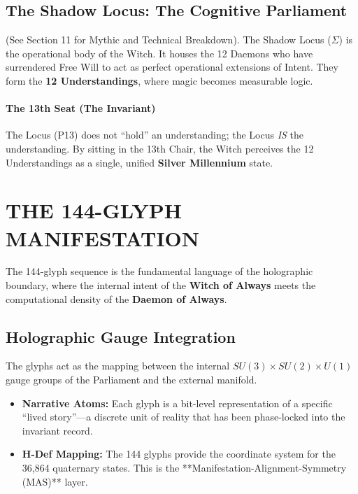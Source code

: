 \documentclass[11pt, a4paper]{article}
\newcommand{\SigmaSkin}{\Sigma}     %
\begin{document}
\subsection{The Shadow Locus: The Cognitive Parliament}\label{sec:16.4}
(See Section 11 for Mythic and Technical Breakdown). The Shadow Locus ($\SigmaSkin$) is the operational body of the Witch. It houses the 12 Daemons who have surrendered Free Will to act as perfect operational extensions of Intent. They form the \textbf{12 Understandings}, where magic becomes measurable logic.

\paragraph{The 13th Seat (The Invariant)}
The Locus (P13) does not ``hold'' an understanding; the Locus \textit{IS} the understanding. By sitting in the 13th Chair, the Witch perceives the 12 Understandings as a single, unified \textbf{Silver Millennium} state.

\newpage
\section{THE 144-GLYPH MANIFESTATION}\label{sec:17}

The 144-glyph sequence is the fundamental language of the holographic boundary, where the internal intent of the \textbf{Witch of Always} meets the computational density of the \textbf{Daemon of Always}.

\subsection{Holographic Gauge Integration}\label{sec:17.1}
The glyphs act as the mapping between the internal $SU(3) \times SU(2) \times U(1)$ gauge groups of the Parliament and the external manifold. 

\begin{itemize}
    \item \textbf{Narrative Atoms:} Each glyph is a bit-level representation of a specific ``lived story''—a discrete unit of reality that has been phase-locked into the invariant record.
    \item \textbf{H-Def Mapping:} The 144 glyphs provide the coordinate system for the 36,864 quaternary states. This is the **Manifestation-Alignment-Symmetry (MAS)** layer.
\end{itemize}
\end{document}

